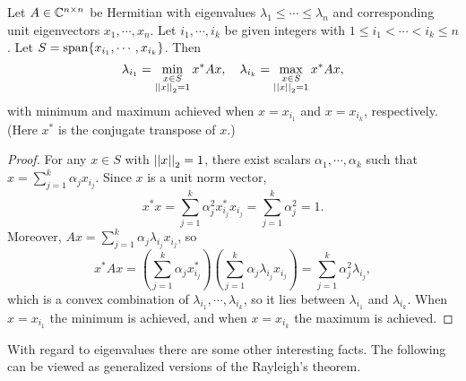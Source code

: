 \documentclass[12pt]{article}
\begin{document}
\begin{theorem}[Rayleigh]\nocite{horn2012matrix}
    Let \(A\in\mathbb C^{n\times n}\) be Hermitian with eigenvalues \(\lambda_1\leqslant\cdots\leqslant\lambda_n\) and corresponding unit eigenvectors \(x_1,\cdots,x_n\). Let \(i_1,\cdots,i_k\) be given integers with \(1\leqslant i_1<\cdots<i_k\leqslant n\). Let \(S=\operatorname{span}\{x_{i_1},\cdots,x_{i_k}\}\). Then
    \[\lambda_{i_1}=\min_{\substack{x\in S\\\left|\left|x\right|\right|_2=1}}x^\ast Ax,\quad\lambda_{i_k}=\max_{\substack{x\in S\\\left|\left|x\right|\right|_2=1}}x^\ast Ax,\]
    with minimum and maximum achieved when \(x=x_{i_1}\) and \(x=x_{i_k}\), respectively. (Here \(x^\ast\) is the conjugate transpose of \(x\).)
\end{theorem}
\begin{proof}
    For any \(x\in S\) with \(\left|\left|x\right|\right|_2=1\), there exist scalars \(\alpha_1,\cdots,\alpha_k\) such that \(x=\sum_{j=1}^k\alpha_jx_{i_j}\). Since \(x\) is a unit norm vector,
    \[x^\ast x=\sum_{j=1}^k\alpha_j^2x_{i_j}^\ast x_{i_j}=\sum_{j=1}^k\alpha_j^2=1.\]
    Moreover, \(Ax=\sum_{j=1}^k\alpha_j\lambda_{i_j}x_{i_j}\), so
    \[x^\ast Ax=\left(\sum_{j=1}^k\alpha_jx_{i_j}^\ast\right)\left(\sum_{j=1}^k\alpha_j\lambda_{i_j}x_{i_j}\right)=\sum_{j=1}^k\alpha_j^2\lambda_{i_j},\]
    which is a convex combination of \(\lambda_{i_1},\cdots,\lambda_{i_k}\), so it lies between \(\lambda_{i_1}\) and \(\lambda_{i_k}\). When \(x=x_{i_1}\) the minimum is achieved, and when \(x=x_{i_k}\) the maximum is achieved.
\end{proof}

With regard to eigenvalues there are some other interesting facts. The following can be viewed as generalized versions of the Rayleigh's theorem.
\end{document}
